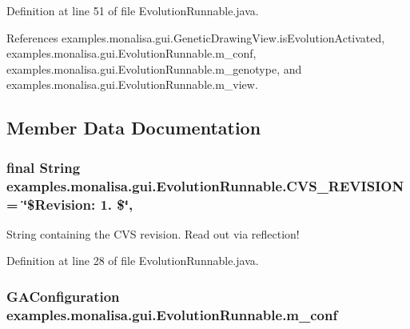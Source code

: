 Definition at line 51 of file Evolution\-Runnable.\-java.



References examples.\-monalisa.\-gui.\-Genetic\-Drawing\-View.\-is\-Evolution\-Activated, examples.\-monalisa.\-gui.\-Evolution\-Runnable.\-m\-\_\-conf, examples.\-monalisa.\-gui.\-Evolution\-Runnable.\-m\-\_\-genotype, and examples.\-monalisa.\-gui.\-Evolution\-Runnable.\-m\-\_\-view.



\subsection{Member Data Documentation}
\hypertarget{classexamples_1_1monalisa_1_1gui_1_1_evolution_runnable_ab61681ab078112fad6e4e10e01252c2d}{
\subsubsection[{C\-V\-S\-\_\-\-R\-E\-V\-I\-S\-I\-O\-N}]{\setlength{\rightskip}{0pt plus 5cm}final String examples.\-monalisa.\-gui.\-Evolution\-Runnable.\-C\-V\-S\-\_\-\-R\-E\-V\-I\-S\-I\-O\-N = \char`\"{}\$Revision\-: 1. \$\char`\"{}\hspace{0.3cm}{\ttfamily [static]}, {\ttfamily [private]}}}\label{classexamples_1_1monalisa_1_1gui_1_1_evolution_runnable_ab61681ab078112fad6e4e10e01252c2d}
String containing the C\-V\-S revision. Read out via reflection! 

Definition at line 28 of file Evolution\-Runnable.\-java.

\hypertarget{classexamples_1_1monalisa_1_1gui_1_1_evolution_runnable_af4a5be4b483b1ad52cff191fd76790ad}{
\subsubsection[{m\-\_\-conf}]{\setlength{\rightskip}{0pt plus 5cm}G\-A\-Configuration examples.\-monalisa.\-gui.\-Evolution\-Runnable.\-m\-\_\-conf\hspace{0.3cm}{\ttfamily [private]}}}\label{classexamples_1_1monalisa_1_1gui_1_1_evolution_runnable_af4a5be4b483b1ad52cff191fd76790ad}


